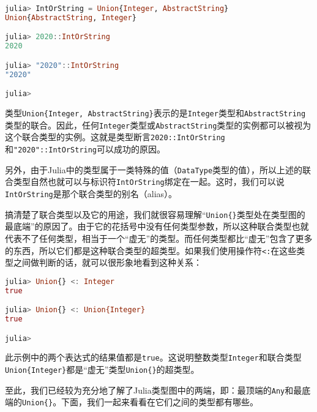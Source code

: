 \begin{lstlisting}[language=julia]
julia> IntOrString = Union{Integer, AbstractString} 
Union{AbstractString, Integer}

julia> 2020::IntOrString
2020

julia> "2020"::IntOrString
"2020"

julia> 
\end{lstlisting}

类型\verb|Union{Integer, AbstractString}|表示的是\verb|Integer|类型和\verb|AbstractString|类型的联合。因此，任何\verb|Integer|类型或\verb|AbstractString|类型的实例都可以被视为这个联合类型的实例。这就是类型断言\verb|2020::IntOrString|和\verb|"2020"::IntOrString|可以成功的原因。

另外，由于Julia中的类型属于一类特殊的值（\verb|DataType|类型的值），所以上述的联合类型自然也就可以与标识符\verb|IntOrString|绑定在一起。这时，我们可以说\verb|IntOrString|是那个联合类型的别名（alias）。

搞清楚了联合类型以及它的用途，我们就很容易理解“\verb|Union{}|类型处在类型图的最底端”的原因了。由于它的花括号中没有任何类型参数，所以这种联合类型也就代表不了任何类型，相当于一个“虚无”的类型。而任何类型都比“虚无”包含了更多的东西，所以它们都是这种联合类型的超类型。如果我们使用操作符\verb|<:|在这些类型之间做判断的话，就可以很形象地看到这种关系：

\begin{lstlisting}[language=julia]
julia> Union{} <: Integer
true

julia> Union{} <: Union{Integer}
true

julia> 
\end{lstlisting}

此示例中的两个表达式的结果值都是\verb|true|。这说明整数类型\verb|Integer|和联合类型\verb|Union{Integer}|都是“虚无”类型\verb|Union{}|的超类型。

至此，我们已经较为充分地了解了Julia类型图中的两端，即：最顶端的\verb|Any|和最底端的\verb|Union{}|。下面，我们一起来看看在它们之间的类型都有哪些。